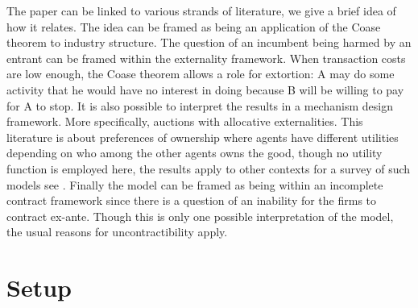 The paper can be linked to various strands of literature, we give a brief idea of how it relates. The idea can be framed as being an application of the Coase theorem to industry structure. The question of an incumbent being harmed by an entrant can be framed within the externality framework. When transaction costs are low enough, the Coase theorem allows a role for extortion: A may do some activity that he would have no interest in doing because B will be willing to pay for A to stop\citep{Kuechle2012}. It is also possible to interpret the results in a mechanism design framework. More specifically, auctions with allocative externalities. This literature is about preferences of ownership where agents have different utilities depending on who among the other agents owns the good, though no utility function is employed here, the results apply to other contexts for a survey of such models see \cite{Jehiel2005}. Finally the model can be framed as being within an incomplete contract framework since there is a question of an inability for the firms to contract ex-ante. Though this is only one possible interpretation of the model, the usual reasons for uncontractibility apply\citep{Hart1999}.
\section{Setup}\label{setup}
